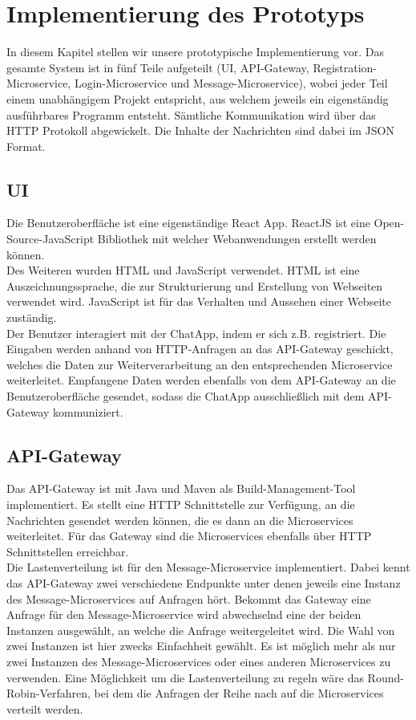 \section{Implementierung des Prototyps}

In diesem Kapitel stellen wir unsere prototypische Implementierung vor. Das gesamte System ist in fünf Teile aufgeteilt (UI, API-Gateway, Registration-Microservice, Login-Microservice und Message-Microservice), wobei jeder Teil einem unabhängigem Projekt entspricht, aus welchem jeweils ein eigenständig ausführbares Programm entsteht.
Sämtliche Kommunikation wird über das \ac{HTTP} Protokoll abgewickelt. Die Inhalte der Nachrichten sind dabei im \ac{JSON} Format.

\subsection{UI}
Die Benutzeroberfläche ist eine eigenständige React App. ReactJS ist eine Open-Source-JavaScript Bibliothek mit welcher Webanwendungen erstellt werden können.\\
Des Weiteren wurden \ac{HTML} und JavaScript verwendet. HTML ist eine Auszeichnungssprache, die zur Strukturierung und Erstellung von Webseiten verwendet wird. JavaScript ist für das Verhalten und Aussehen einer Webseite zuständig.\\
Der Benutzer interagiert mit der ChatApp, indem er sich z.B. registriert. Die Eingaben werden anhand von HTTP-Anfragen an das API-Gateway geschickt, welches die Daten zur Weiterverarbeitung an den entsprechenden Microservice weiterleitet. Empfangene Daten werden ebenfalls von dem API-Gateway an die Benutzeroberfläche gesendet, sodass die ChatApp ausschließlich mit dem API-Gateway kommuniziert.

\subsection{API-Gateway}
Das API-Gateway ist mit Java und Maven als Build-Management-Tool implementiert. Es stellt eine HTTP Schnittstelle zur Verfügung, an die Nachrichten gesendet werden können, die es dann an die Microservices weiterleitet. Für das Gateway sind die Microservices ebenfalls über HTTP Schnittstellen erreichbar.\\
Die Lastenverteilung ist für den Message-Microservice implementiert. Dabei kennt das API-Gateway zwei verschiedene Endpunkte unter denen jeweils eine Instanz des Message-Microservices auf Anfragen hört. Bekommt das Gateway eine Anfrage für den Message-Microservice wird abwechselnd eine der beiden Instanzen ausgewählt, an welche die Anfrage weitergeleitet wird. Die Wahl von zwei Instanzen ist hier zwecks Einfachheit gewählt. Es ist möglich mehr als nur zwei Instanzen des Message-Microservices oder eines anderen Microservices zu verwenden. Eine Möglichkeit um die Lastenverteilung zu regeln wäre das Round-Robin-Verfahren, bei dem die Anfragen der Reihe nach auf die Microservices verteilt werden.

